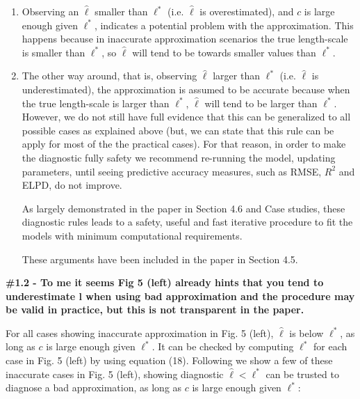 \documentclass[11pt]{report}
\begin{document}
\begin{enumerate}
\item  Observing an $\hat{\ell}$ smaller than $\ell^*$ (i.e. $\hat{\ell}$ is overestimated), and $c$ is large enough given $\ell^*$, indicates a potential problem with the approximation. This happens because in inaccurate approximation scenarios the true length-scale is smaller than $\ell^*$, so $\hat{\ell}$ will tend to be towards smaller values than $\ell^*$.

\item The other way around, that is, observing $\hat{\ell}$ larger than $\ell^*$ (i.e. $\hat{\ell}$ is underestimated), the approximation is assumed to be accurate because when the true length-scale is larger than $\ell^*$, $\hat{\ell}$ will tend to be larger than $\ell^*$. However, we do not still have full evidence that this can be generalized to all possible cases as explained above (but, we can state that this rule can be apply for most of the the practical cases). For that reason, in order to make the diagnostic fully safety we recommend re-running the model, updating parameters, until seeing predictive accuracy measures, such as RMSE, $R^2$ and ELPD, do not improve.

As largely demonstrated in the paper in Section 4.6 and Case studies, these diagnostic rules leads to a safety, useful and fast iterative procedure to fit the models with minimum computational requirements.

These arguments have been included in the paper in Section 4.5. 
\end{enumerate} 

\textbf{\#1.2 - To me it seems Fig 5 (left) already hints that you tend to underestimate l when using bad approximation and the procedure may be valid in practice, but this is not transparent in the paper.}

For all cases showing inaccurate approximation in Fig. 5 (left), $\hat{\ell}$ is below $\ell^*$, as long as $c$ is large enough given $\ell^*$. It can be checked by computing $\ell^*$ for each case in Fig. 5 (left) by using equation (18). Following we show a few of these inaccurate cases in Fig. 5 (left), showing diagnostic $\hat{\ell} < \ell^*$ can be trusted to diagnose a bad approximation, as long as $c$ is large enough given $\ell^*$:
\end{document}
